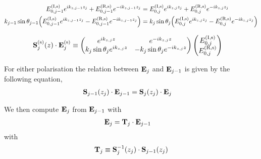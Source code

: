 \begin{align*}
	E^{\text{(I,s)}}_{0,j-1}e^{ik_{z,j-1}z_j} + E^{\text{(R,s)}}_{0,j-1}e^{-ik_{z,j-1}z_j}                               & =
	E^{\text{(I,s)}}_{0,j}e^{ik_{z,j}z_j} + E^{\text{(R,s)}}_{0,j} e^{-ik_{z,j}z_j}
	\\
	k_{j-1}\sin\theta_{j-1}\pqty{E^{\text{(I,s)}}_{0,j-1}e^{ik_{z,j-1}z_j} - E^{\text{(R,s)}}_{0,j-1}e^{-ik_{z,j-1}z_j}} & =
	k_{j}\sin\theta_{j}\pqty{E^{\text{(I,s)}}_{0,j}e^{ik_{z,j}z_j} - E^{\text{(R,s)}}_{0,j}e^{-ik_{z,j}z_j}}
\end{align*}

\begin{align*}
	\vb{S}^{\text{(s)}}_j\pqty{z} \cdot \vb{E}^{\text{(s)}}_j
	                                 & \equiv
	\pmqty{
	e^{ik_{z,j}z}                    &
	e^{-ik_{z,j}z}                            \\
	k_j \sin\theta_{j} e^{ik_{z,j}z} &
	- k_j \sin\theta_{j} e^{-ik_{z,j}z}
	}
	\pmqty{
	E^{\text{(I,s)}}_{0,j}                    \\
		E^{\text{(R,s)}}_{0,j}
	}
\end{align*}



For either polarisation the relation between $\vb{E}_j$ and $\vb{E}_{j-1}$ is given by the following equation,
\begin{align*}
	\vb{S}_{j-1}\pqty{z_j} \cdot \vb{E}_{j-1} & = \vb{S}_j\pqty{z_j} \cdot \vb{E}_j
\end{align*}

We then compute $\vb{E}_j$ from $\vb{E}_{j-1}$ with
\begin{align*}
	\vb{E}_j & = \vb{T}_j \cdot \vb{E}_{j-1}
\end{align*} with
\begin{align*}
	\vb{T}_j \equiv \vb{S}^{-1}_j\pqty{z_j} \cdot\vb{S}_{j-1}\pqty{z_j}
\end{align*}


